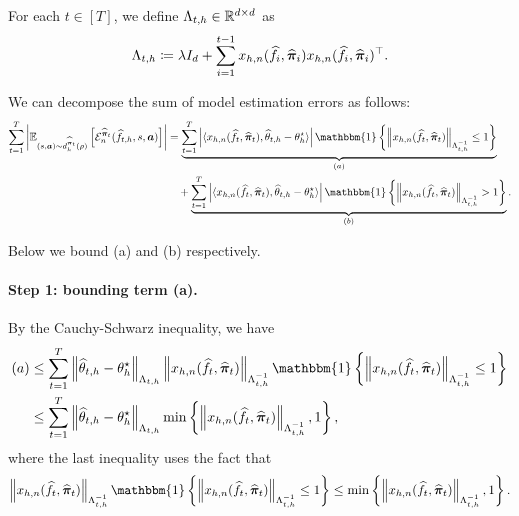     
    For each $t\in[T]$, we define $\Lambda_{t,h}\in\mathbb{R}^{d\times d}$ as
\begin{align}\label{eq:Lambda_mg}
    \Lambda_{t,h}\coloneqq \lambda I_d + \sum_{i=1}^{t-1} x_{h,n}(\widehat{f}_i,\widehat{{\bm{\pi}}}_i)x_{h,n}(\widehat{f}_i,\widehat{{\bm{\pi}}}_i)^\top.
\end{align} 

We can decompose the sum of model estimation errors as follows:
\begin{align}\label{eq:dec_mg}
\sum_{t=1}^T \left| \E_{(s,\va)\sim d_h^{\widehat{\vpi}_{t}}(\rho)}\left[\gE_n^{\widehat{\vpi}_{t}}(\widehat{f}_{t,h},s,\va)\right]\right| 
    &= \underbrace{\sum_{t=1}^T \left| \langle x_{h,n}(\widehat{f}_{t},\widehat{\vpi}_{t}),\widehat{\theta}_{t,h}-\theta_h^\star\rangle\right|\mathbbm{1}\left\{\norm{x_{h,n}(\widehat{f}_{t},\widehat{\vpi}_{t})}_{\Lambda_{t,h}^{-1}}\leq 1\right\}}_{(a)}\notag\\
    & \quad+ \underbrace{\sum_{t=1}^T \left| \langle x_{h,n}(\widehat{f}_{t},\widehat{\vpi}_{t}),\widehat{\theta}_{t,h}-\theta_h^\star\rangle\right|\mathbbm{1}\left\{\norm{x_{h,n}(\widehat{f}_{t},\widehat{\vpi}_{t})}_{\Lambda_{t,h}^{-1}}> 1\right\}}_{(b)}.
\end{align}

Below we bound (a) and (b) respectively.

\paragraph{Step 1: bounding term (a).}
By the Cauchy-Schwarz inequality, we have
\begin{align}\label{eq:bound_a_1}
    (a)&\leq \sum_{t=1}^T \norm{\widehat{\theta}_{t,h}-\theta_h^\star}_{\Lambda_{t,h}}\norm{x_{h,n}(\widehat{f}_{t},\widehat{\vpi}_{t})}_{\Lambda_{t,h}^{-1}}\mathbbm{1}\left\{\norm{x_{h,n}(\widehat{f}_{t},\widehat{\vpi}_{t})}_{\Lambda_{t,h}^{-1}}\leq 1\right\}\notag\\
    &\leq \sum_{t=1}^T \norm{\widehat{\theta}_{t,h}-\theta_h^\star}_{\Lambda_{t,h}}\min\left\{ \norm{x_{h,n}(\widehat{f}_{t},\widehat{\vpi}_{t})}_{\Lambda_{t,h}^{-1}},1\right\},
\end{align}
where the last inequality uses the fact that
$$\norm{x_{h,n}(\widehat{f}_{t},\widehat{\vpi}_{t})}_{\Lambda_{t,h}^{-1}}\mathbbm{1}\left\{\norm{x_{h,n}(\widehat{f}_{t},\widehat{\vpi}_{t})}_{\Lambda_{t,h}^{-1}}\leq 1\right\}\leq \min\left\{ \norm{x_{h,n}(\widehat{f}_{t},\widehat{\vpi}_{t})}_{\Lambda_{t,h}^{-1}},1\right\}.$$

